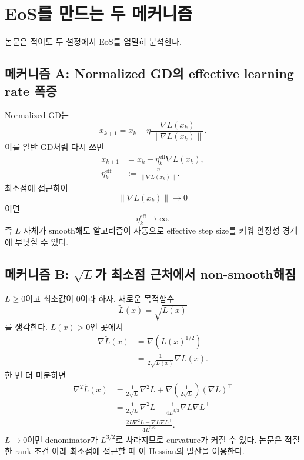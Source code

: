 \documentclass[11pt,a4paper,oneside,openany]{memoir}
\newcommand{\grad}{\nabla}
\newcommand{\Hess}{\nabla^2}
\newcommand{\norm}[1]{\left\lVert #1\right\rVert}
\theoremstyle{definition}
\begin{document}
\section{EoS를 만드는 두 메커니즘}

논문은 적어도 두 설정에서 EoS를 엄밀히 분석한다.

\subsection{메커니즘 A: Normalized GD의 effective learning rate 폭증}

Normalized GD는
\begin{equation}
  x_{k+1}
  =x_k-\eta\frac{\grad L(x_k)}{\norm{\grad L(x_k)}}.
  \label{eq:ngd}
\end{equation}
이를 일반 GD처럼 다시 쓰면
\begin{align}
  x_{k+1}
  &=x_k-\eta_k^{\mathrm{eff}}\grad L(x_k),\\
  \eta_k^{\mathrm{eff}}
  &:=\frac{\eta}{\norm{\grad L(x_k)}}.
\end{align}
최소점에 접근하여
\begin{equation}
  \norm{\grad L(x_k)}\to0
\end{equation}
이면
\begin{equation}
  \boxed{\eta_k^{\mathrm{eff}}\to\infty.}
\end{equation}
즉 $L$ 자체가 smooth해도 알고리즘이 자동으로 effective step size를 키워 안정성 경계에 부딪힐 수 있다.

\subsection{메커니즘 B: \texorpdfstring{$\sqrt{L}$}{sqrt(L)}가 최소점 근처에서 non-smooth해짐}

$L\ge0$이고 최소값이 0이라 하자. 새로운 목적함수
\begin{equation}
  \widetilde L(x)=\sqrt{L(x)}
\end{equation}
를 생각한다. $L(x)>0$인 곳에서
\begin{align}
  \grad\widetilde L(x)
  &=\grad\!\left(L(x)^{1/2}\right)\\
  &=\frac{1}{2\sqrt{L(x)}}\grad L(x).
\end{align}
한 번 더 미분하면
\begin{align}
  \Hess\widetilde L(x)
  &=\frac{1}{2\sqrt{L}}\Hess L
   +\grad\!\left(\frac{1}{2\sqrt L}\right)(\grad L)^\top\\
  &=\frac{1}{2\sqrt L}\Hess L
   -\frac{1}{4L^{3/2}}\grad L\grad L^\top\\
  &=\boxed{\frac{2L\Hess L-\grad L\grad L^\top}{4L^{3/2}}}.
  \label{eq:sqrt-hessian}
\end{align}
$L\to0$이면 denominator가 $L^{3/2}$로 사라지므로 curvature가 커질 수 있다.
논문은 적절한 rank 조건 아래 최소점에 접근할 때 이 Hessian의 발산을 이용한다.
\end{document}

